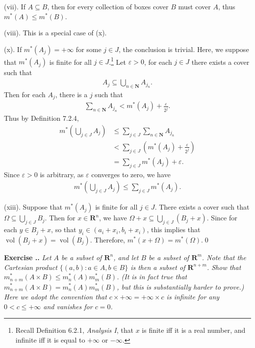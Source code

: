 \documentclass{book}
\DeclareMathOperator{\vol}{vol}
\newcounter{Exercise}[section]
\renewcommand{\theExercise}{\thesection.\arabic{Exercise}.}
\newcommand{\new}{\vspace{1.5em}\noindent\textbf{Exercise \stepcounter{Exercise}\textbf{\theExercise}} }
\begin{document}
(vii). If $A \subseteq B$, then for every collection of boxes cover $B$ must cover $A$, thus $m^*(A) \leq m^*(B)$.

(viii). This is a special case of (x).

(x). If $m^*(A_j) = +\infty$ for some $j \in J$, the conclusion is trivial. Here, we suppose that $m^*(A_j)$ is finite for all $j \in J$.\footnote{Recall Definition 6.2.1, \emph{Analysis I}, that $x$ is finite iff it is a real number, and infinite iff it is equal to $+\infty$ or $-\infty$.} Let $\varepsilon>0$, for each $j \in J$ there exists a cover such that
    \begin{align*}
        A_j \subseteq \bigcup_{n \in \mathbf{N}} A_{j_n}.
    \end{align*}
Then for each $A_j$, there is a $j$ such that
    \begin{align*}
        \sum_{n \in \mathbf{N}} A_{j_n} < m^*(A_j) + \frac{\varepsilon}{2^j}.
    \end{align*}
Thus by Definition 7.2.4,
    \begin{align*}
        m^*\left( \bigcup_{j \in J} A_j \right)
        &\leq \sum_{j \in J} \sum_{n \in \mathbf{N}} A_{j_n}\\
        &< \sum_{j \in J} \left( m^*(A_j) + \frac{\varepsilon}{2^j} \right)\\
        &= \sum_{j \in J} m^*(A_j) + \varepsilon.
    \end{align*}
Since $\varepsilon>0$ is arbitrary, as $\varepsilon$ converges to zero, we have
    \begin{align*}
        m^*\left( \bigcup_{j \in J} A_j \right) \leq \sum_{j \in J} m^*(A_j).
    \end{align*}

(xiii). Suppose that $m^*(A_j)$ is finite for all $j \in J$. There exists a cover such that $\Omega \subseteq \bigcup_{j \in J} B_j$. Then for $x \in \mathbf{R}^n$, we have $\Omega + x \subseteq \bigcup_{j \in J} (B_j + x)$. Since for each $y \in B_j + x$, so that $y_i \in (a_i + x_i, b_i + x_i)$, this implies that $\vol(B_j + x) = \vol(B_j)$. Therefore, $m^*(x + \Omega) = m^*(\Omega)$.\qed

\new\emph{Let $A$ be a subset of $\mathbf{R}^n$, and let $B$ be a subset of $\mathbf{R}^m$. Note that the Cartesian product $\{(a, b) : a \in A, b \in B\}$ is then a subset of $\mathbf{R}^{n+m}$. Show that $m^*_{n+m}(A \times B) \leq m^*_{n}(A) m^*_{m}(B)$. (It is in fact true that $m^*_{n+m} (A \times B) = m^*_{n}(A) m^*_{m}(B)$, but this is substantially harder to prove.) Here we adopt the convention that $c \times +\infty = +\infty \times c$ is infinite for any $0 < c \leq +\infty$ and vanishes for $c = 0$.}
\end{document}
